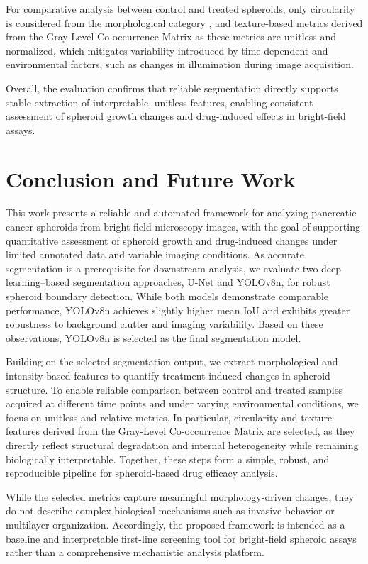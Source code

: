 \documentclass[sigconf, nonacm]{acmart}
\begin{document}
For comparative analysis between control and treated spheroids, only circularity is considered from the morphological category \cite{ref11}, and texture-based metrics derived from the Gray-Level Co-occurrence Matrix as these metrics are unitless and normalized, which mitigates variability introduced by time-dependent and environmental factors, such as changes in illumination during image acquisition.

Overall, the evaluation confirms that reliable segmentation directly supports stable extraction of interpretable, unitless features, enabling consistent assessment of spheroid growth changes and drug-induced effects in bright-field assays.
\section{Conclusion and Future Work}\label{conclusion}

This work presents a reliable and automated framework for analyzing pancreatic cancer spheroids from bright-field microscopy images, with the goal of supporting quantitative assessment of spheroid growth and drug-induced changes under limited annotated data and variable imaging conditions. As accurate segmentation is a prerequisite for downstream analysis, we evaluate two deep learning–based segmentation approaches, U-Net and YOLOv8n, for robust spheroid boundary detection. While both models demonstrate comparable performance, YOLOv8n achieves slightly higher mean IoU and exhibits greater robustness to background clutter and imaging variability. Based on these observations, YOLOv8n is selected as the final segmentation model.

Building on the selected segmentation output, we extract morphological and intensity-based features to quantify treatment-induced changes in spheroid structure. To enable reliable comparison between control and treated samples acquired at different time points and under varying environmental conditions, we focus on unitless and relative metrics. In particular, circularity and texture features derived from the Gray-Level Co-occurrence Matrix are selected, as they directly reflect structural degradation and internal heterogeneity while remaining biologically interpretable. Together, these steps form a simple, robust, and reproducible pipeline for spheroid-based drug efficacy analysis.

While the selected metrics capture meaningful morphology-driven changes, they do not describe complex biological mechanisms such as invasive behavior or multilayer organization. Accordingly, the proposed framework is intended as a baseline and interpretable first-line screening tool for bright-field spheroid assays rather than a comprehensive mechanistic analysis platform.
\end{document}
